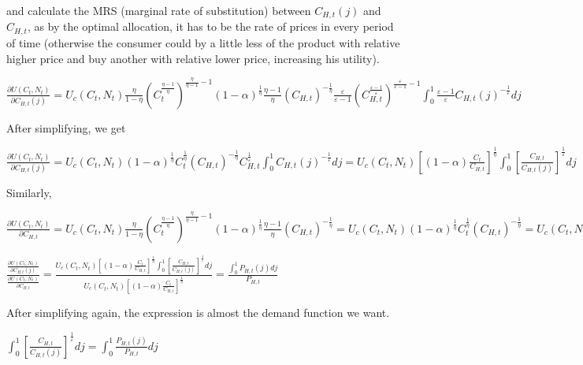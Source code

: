 \documentclass[
]{article}
\begin{document}
and calculate the MRS (marginal rate of substitution) between
\(C_{H,t}(j)\) and \(C_{H,t}\), as by the optimal allocation, it has to
be the rate of prices in every period of time (otherwise the consumer
could by a little less of the product with relative higher price and buy
another with relative lower price, increasing his utility).

\(\displaystyle \frac{\partial U(C_t,N_t)}{\partial C_{H,t}(j)} = U_c(C_t,N_t)\frac{\eta}{1-\eta}\left( C_t^{\frac{\eta-1}{\eta}} \right)^{\frac{\eta}{\eta-1}-1} (1-\alpha)^{\frac{1}{\eta}}\frac{\eta-1}{\eta}\left( C_{H,t}\right)^{-\frac{1}{\eta}}\frac{\varepsilon}{\varepsilon-1}\left(C_{H,t}^{\frac{\varepsilon-1}{\varepsilon}} \right)^{\frac{\varepsilon}{\varepsilon-1}-1}\int_0^1 \frac{\varepsilon-1}{\varepsilon} C_{H,t}(j)^{-\frac{1}{\varepsilon}}dj\)

After simplifying, we get

\(\displaystyle \frac{\partial U(C_t,N_t)}{\partial C_{H,t}(j)} = U_c(C_t,N_t) (1-\alpha)^{\frac{1}{\eta}} C_t^{\frac{1}{\eta}}\left( C_{H,t}\right)^{-\frac{1}{\eta}}C_{H,t}^{\frac{1}{\varepsilon}} \int_0^1 C_{H,t}(j)^{-\frac{1}{\varepsilon}}dj = U_c(C_t,N_t) \left[ (1-\alpha) \frac{C_t}{C_{H,t}} \right]^{\frac{1}{\eta}} \int_0^1 \left[\frac{C_{H,t}}{C_{H,t}(j)}\right]^{\frac{1}{\varepsilon}}dj\)

Similarly,

\(\displaystyle \frac{\partial U(C_t,N_t)}{\partial C_{H,t}} = U_c(C_t,N_t)\frac{\eta}{1-\eta}\left( C_t^{\frac{\eta-1}{\eta}} \right)^{\frac{\eta}{\eta-1}-1} (1-\alpha)^{\frac{1}{\eta}}\frac{\eta-1}{\eta}\left( C_{H,t}\right)^{-\frac{1}{\eta}} = U_c(C_t,N_t) (1-\alpha)^{\frac{1}{\eta}} C_t^{\frac{1}{\eta}}\left( C_{H,t}\right)^{-\frac{1}{\eta}} = U_c(C_t,N_t) \left[ (1-\alpha) \frac{C_t}{C_{H,t}} \right]^{\frac{1}{\eta}}\)

\(\displaystyle \frac{\displaystyle \frac{\partial U(C_t,N_t)}{\displaystyle \partial C_{H,t}(j)}}{\frac{\displaystyle \partial U(C_t,N_t)}{\displaystyle \partial C_{H,t}}} = \frac{\displaystyle U_c(C_t,N_t) \left[ (1-\alpha) \frac{C_t}{C_{H,t}} \right]^{\frac{1}{\eta}} \int_0^1 \left[\frac{C_{H,t}}{C_{H,t}(j)}\right]^{\frac{1}{\varepsilon}}dj}{\displaystyle U_c(C_t,N_t) \left[ (1-\alpha) \frac{C_t}{C_{H,t}} \right]^{\frac{1}{\eta}}} = \frac{\displaystyle \int_0^1P_{H,t}(j)dj}{P_{H,t}}\)

After simplifying again, the expression is almost the demand function we
want.

\(\displaystyle \int_0^1 \left[\frac{C_{H,t}}{C_{H,t}(j)}\right]^{\frac{1}{\varepsilon}}dj = \displaystyle \int_0^1 \frac{P_{H,t}(j)}{P_{H,t}}dj\)
\end{document}
